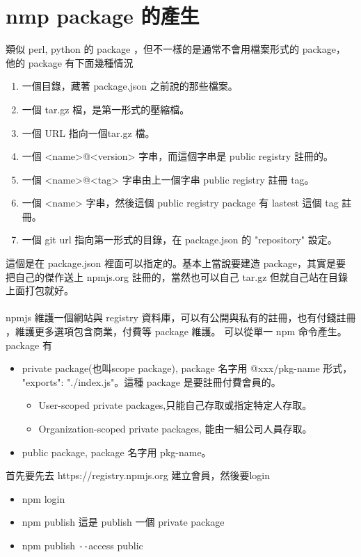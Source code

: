   \section{nmp package 的產生}
  類似 perl, python 的 package ，但不一樣的是通常不會用檔案形式的 package，
  他的 package 有下面幾種情況
  \begin{enumerate}
    \item 一個目錄，藏著 package.json 之前說的那些檔案。
    \item 一個 tar.gz 檔，是第一形式的壓縮檔。
    \item 一個 URL 指向一個tar.gz 檔。
    \item 一個 <name>@<version> 字串，而這個字串是 public registry 註冊的。
    \item 一個 <name>@<tag> 字串由上一個字串 public registry 註冊 tag。
    \item 一個 <name> 字串，然後這個 public registry package 有 lastest 這個
      tag 註冊。
    \item 一個 git url 指向第一形式的目錄，在 package.json 的 "repository" 
      設定。
  \end{enumerate}
  這個是在 package.json 裡面可以指定的。基本上當說要建造 package，其實是要
  把自己的傑作送上 npmjs.org 註冊的，當然也可以自己 tar.gz 但就自己站在目錄
  上面打包就好。
  \\\\
  npmjs 維護一個網站與 registry 資料庫，可以有公開與私有的註冊，也有付錢註冊
  ，維護更多選項包含商業，付費等 package 維護。
  可以從單一 npm 命令產生。package 有
  \begin{itemize}
    \item private package(也叫scope package), package 名字用 @xxx/pkg-name 形式，
      "exports": "./index.js"。這種 package 是要註冊付費會員的。
      \begin{itemize}
        \item User-scoped private packages,只能自己存取或指定特定人存取。
        \item Organization-scoped private packages, 能由一組公司人員存取。
      \end{itemize}
    \item public package, package 名字用 pkg-name。
  \end{itemize}
  首先要先去 https://registry.npmjs.org 建立會員，然後要login
  \begin{itemize}
    \item npm login
    \item npm publish 這是 publish 一個 private package
    \item npm publish \verb=--=access public
  \end{itemize}
